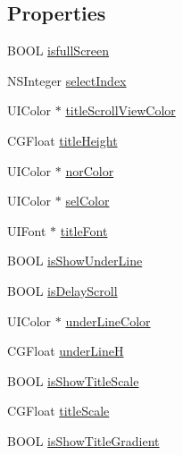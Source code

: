 \subsection*{Properties}
\begin{DoxyCompactItemize}
\item 
B\+O\+OL \mbox{\hyperlink{interface_y_z_display_view_controller_a5f2b5dc3bb48be420377b4de825183fb}{isfull\+Screen}}
\item 
N\+S\+Integer \mbox{\hyperlink{interface_y_z_display_view_controller_ae3d0c0a349c39df9f532328caa893ab3}{select\+Index}}
\item 
U\+I\+Color $\ast$ \mbox{\hyperlink{interface_y_z_display_view_controller_ac135289ee6abf6154d8e65d3676432fd}{title\+Scroll\+View\+Color}}
\item 
C\+G\+Float \mbox{\hyperlink{interface_y_z_display_view_controller_a7c9e5049f9ea3134bef1badf608b2bec}{title\+Height}}
\item 
U\+I\+Color $\ast$ \mbox{\hyperlink{interface_y_z_display_view_controller_a3cb65b83838e614e40dc71ed6945f676}{nor\+Color}}
\item 
U\+I\+Color $\ast$ \mbox{\hyperlink{interface_y_z_display_view_controller_ae46f971a9bc48ccd76fa7e33710bcd25}{sel\+Color}}
\item 
U\+I\+Font $\ast$ \mbox{\hyperlink{interface_y_z_display_view_controller_ae89554fab1377af1ec9a140ec565533d}{title\+Font}}
\item 
B\+O\+OL \mbox{\hyperlink{interface_y_z_display_view_controller_a7b8651d654ae06a6d67a937f0f5b43c7}{is\+Show\+Under\+Line}}
\item 
B\+O\+OL \mbox{\hyperlink{interface_y_z_display_view_controller_a3626735669e0846e0f393a087adc9d63}{is\+Delay\+Scroll}}
\item 
U\+I\+Color $\ast$ \mbox{\hyperlink{interface_y_z_display_view_controller_adec5ac1b84067893a1eef65121e82125}{under\+Line\+Color}}
\item 
C\+G\+Float \mbox{\hyperlink{interface_y_z_display_view_controller_a1e9a2d9dda7aad55700b7f1eff4f873a}{under\+LineH}}
\item 
B\+O\+OL \mbox{\hyperlink{interface_y_z_display_view_controller_a0d58a4b02d858b61b2cd8f4bbd8b1634}{is\+Show\+Title\+Scale}}
\item 
C\+G\+Float \mbox{\hyperlink{interface_y_z_display_view_controller_a1f6046fd38b80152b7b8d06206c96a2b}{title\+Scale}}
\item 
B\+O\+OL \mbox{\hyperlink{interface_y_z_display_view_controller_a85e15d312689230e5643449cc7a57050}{is\+Show\+Title\+Gradient}}

\end{DoxyCompactItemize}
